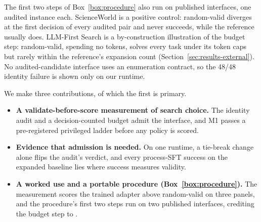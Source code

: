 The first two steps of Box~\ref{box:procedure} also run on published interfaces, one audited instance each.
ScienceWorld \citep{wang2022scienceworld} is a positive control: random-valid diverges at the first decision of every audited pair and never succeeds, while the reference usually does.
LLM-First Search \citep{herr2025llmfirst} is a by-construction illustration of the budget step: random-valid, spending no tokens, solves every task under its token caps but rarely within the reference's expansion count (Section~\ref{sec:results-external}).
No audited-candidate interface uses an enumeration contract, so the 48/48 identity failure is shown only on our runtime.

We make three contributions, of which the first is primary.

\begin{itemize}[leftmargin=*,itemsep=1pt,parsep=1pt,topsep=2pt]
    \item \textbf{A validate-before-score measurement of search choice.} The identity audit and a decision-counted budget \citep{li2019random} admit the interface, and M1 passes a pre-registered privileged ladder before any policy is scored.
    \item \textbf{Evidence that admission is needed.} On one runtime, a tie-break change alone flips the audit's verdict, and every process-SFT success on the expanded baseline lies where success measures validity.
    \item \textbf{A worked use and a portable procedure (Box~\ref{box:procedure}).} The measurement scores the trained adapter above random-valid on three panels, and the procedure's first two steps run on two published interfaces, crediting the budget step to \citet{li2019random}.
\end{itemize}

